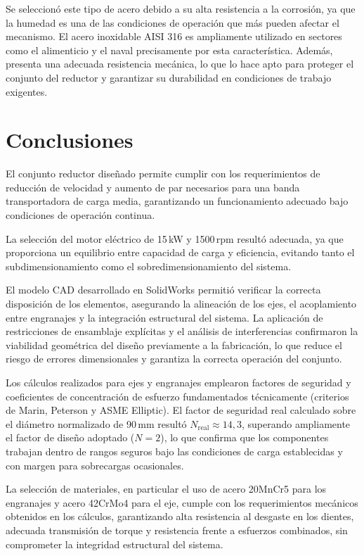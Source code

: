 \documentclass[conference]{IEEEtran}
\begin{document}
Se seleccionó este tipo de acero debido a su alta resistencia a la corrosión, ya que la
humedad es una de las condiciones de operación que más pueden afectar el mecanismo. El
acero inoxidable AISI 316 es ampliamente utilizado en sectores como el alimenticio y el
naval precisamente por esta característica. Además, presenta una adecuada resistencia
mecánica, lo que lo hace apto para proteger el conjunto del reductor y garantizar su
durabilidad en condiciones de trabajo exigentes.

\section{Conclusiones}

El conjunto reductor diseñado permite cumplir con los requerimientos de reducción de
velocidad y aumento de par necesarios para una banda transportadora de carga media,
garantizando un funcionamiento adecuado bajo condiciones de operación continua.

La selección del motor eléctrico de 15\,kW y 1500\,rpm resultó adecuada, ya que
proporciona un equilibrio entre capacidad de carga y eficiencia, evitando tanto el
subdimensionamiento como el sobredimensionamiento del sistema.

El modelo CAD desarrollado en SolidWorks permitió verificar la correcta disposición de
los elementos, asegurando la alineación de los ejes, el acoplamiento entre engranajes y la
integración estructural del sistema. La aplicación de restricciones de ensamblaje
explícitas y el análisis de interferencias confirmaron la viabilidad geométrica del diseño
previamente a la fabricación, lo que reduce el riesgo de errores dimensionales y garantiza
la correcta operación del conjunto.

Los cálculos realizados para ejes y engranajes emplearon factores de seguridad y
coeficientes de concentración de esfuerzo fundamentados técnicamente (criterios de Marin,
Peterson y ASME Elliptic). El factor de seguridad real calculado sobre el diámetro
normalizado de 90\,mm resultó $N_{\text{real}} \approx 14{,}3$, superando ampliamente el
factor de diseño adoptado ($N = 2$), lo que confirma que los componentes trabajan dentro
de rangos seguros bajo las condiciones de carga establecidas y con margen para sobrecargas
ocasionales.

La selección de materiales, en particular el uso de acero 20MnCr5 para los engranajes y
acero 42CrMo4 para el eje, cumple con los requerimientos mecánicos obtenidos en los
cálculos, garantizando alta resistencia al desgaste en los dientes, adecuada transmisión
de torque y resistencia frente a esfuerzos combinados, sin comprometer la integridad
estructural del sistema.
\end{document}
